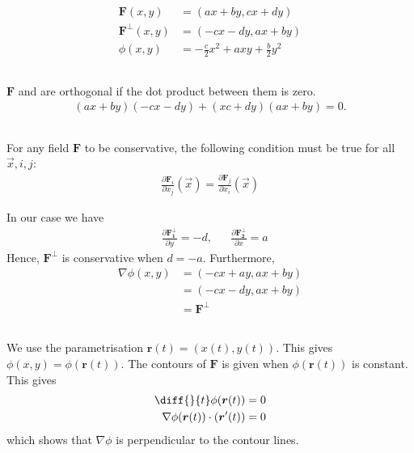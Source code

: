 \documentclass[a4paper,10pt,english]{article}
\begin{document}
\newpage
\section{}
\begin{align*}
    \bm{F}(x, y) &= (ax+by, cx+dy) \\
    \bm{F^\perp}(x, y) &= (-cx-dy, ax+by) \\
    \phi (x, y) &= -\frac{c}{2}x^2 + axy + \frac{b}{2}y^2
\end{align*}

\subsection{}
$\bm{F}$ and  are orthogonal if the dot product between them is zero.
\begin{align*}
    (ax+by)(-cx-dy) + (xc+dy)(ax+by) = 0.
\end{align*}

\subsection{}
For any field $\bm{F}$ to be conservative, the following condition must be true for all $\Vec{x}, i, j$:
\begin{align}
    \frac{\partial \bm{F}_i}{\partial x_j} (\Vec{x})
    = \frac{\partial \bm{F}_j}{\partial x_i} (\Vec{x})
\end{align}

In our case we have
\begin{align*}
    &\frac{\partial \bm{F_1^\perp}}{\partial y} = -d, 
    &&\frac{\partial \bm{F_2^\perp}}{\partial x} = a
\end{align*}
Hence, $\bm{F^\perp}$ is conservative when $d=-a$. Furthermore,
\begin{align*}
    \nabla\phi (x, y)
    &= \left( 
        -cx+ay,
        ax+by
    \right) \\
    &= \left( 
        -cx-dy,
        ax+by
    \right) \\
    &= \bm{F^\perp}
\end{align*}

\subsection{}
We use the parametrisation $\bm{r}(t)=(x(t), y(t))$. This gives $\phi(x, y) = \phi(\bm{r}(t))$. The contours of $\bm{F}$ is given when $\phi(\bm{r}(t))$ is constant. This gives
\begin{align*}
    \diff{}{t} \phi(\bm{r}(t)) &= 0 \\
    \nabla\phi(\bm{r}(t)) \cdot (\bm{r}'(t)) &= 0
\end{align*}
which shows that $\nabla\phi$ is perpendicular to the contour lines. 
\end{document}
